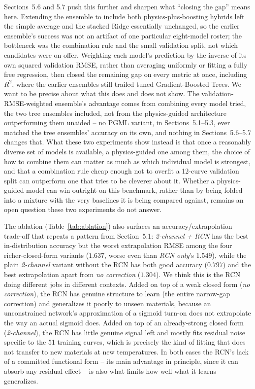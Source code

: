 \documentclass[11pt]{article}
\begin{document}
Sections~5.6 and 5.7 push this further and sharpen what ``closing the gap'' means here. Extending the ensemble to include both physics-plus-boosting hybrids left the simple average and the stacked Ridge essentially unchanged, so the earlier ensemble's success was not an artifact of one particular eight-model roster; the bottleneck was the combination rule and the small validation split, not which candidates were on offer. Weighting each model's prediction by the inverse of its own squared validation RMSE, rather than averaging uniformly or fitting a fully free regression, then closed the remaining gap on every metric at once, including $R^2$, where the earlier ensembles still trailed tuned Gradient-Boosted Trees. We want to be precise about what this does and does not show. The validation-RMSE-weighted ensemble's advantage comes from combining every model tried, the two tree ensembles included, not from the physics-guided architecture outperforming them unaided -- no PGML variant, in Sections~5.1--5.3, ever matched the tree ensembles' accuracy on its own, and nothing in Sections~5.6--5.7 changes that. What these two experiments show instead is that once a reasonably diverse set of models is available, a physics-guided one among them, the choice of how to combine them can matter as much as which individual model is strongest, and that a combination rule cheap enough not to overfit a 12-curve validation split can outperform one that tries to be cleverer about it. Whether a physics-guided model can win outright on this benchmark, rather than by being folded into a mixture with the very baselines it is being compared against, remains an open question these two experiments do not answer.

The ablation (Table~\ref{tab:ablation}) also surfaces an accuracy/extrapolation trade-off that repeats a pattern from Section~5.1: \emph{2-channel + RCN} has the best in-distribution accuracy but the worst extrapolation RMSE among the four richer-closed-form variants ($1.637$, worse even than \emph{RCN only}'s $1.549$), while the plain \emph{2-channel} variant without the RCN has both good accuracy ($0.797$) and the best extrapolation apart from \emph{no correction} ($1.304$). We think this is the RCN doing different jobs in different contexts. Added on top of a weak closed form (\emph{no correction}), the RCN has genuine structure to learn (the entire narrow-gap correction) and generalizes it poorly to unseen materials, because an unconstrained network's approximation of a sigmoid turn-on does not extrapolate the way an actual sigmoid does. Added on top of an already-strong closed form (\emph{2-channel}), the RCN has little genuine signal left and mostly fits residual noise specific to the 51 training curves, which is precisely the kind of fitting that does not transfer to new materials at new temperatures. In both cases the RCN's lack of a committed functional form -- its main advantage in principle, since it can absorb any residual effect -- is also what limits how well what it learns generalizes.
\end{document}
